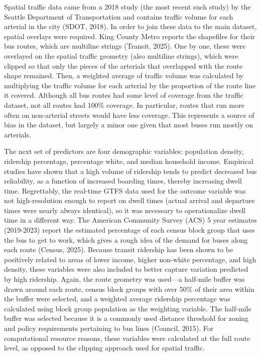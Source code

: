 \documentclass[
  12pt,
]{article}
\begin{document}
Spatial traffic data came from a 2018 study (the most recent such study)
by the Seattle Department of Transportation and contains traffic volume
for each arterial in the city (SDOT, 2018). In order to join these data
to the main dataset, spatial overlays were required. King County Metro
reports the shapefiles for their bus routes, which are multiline strings
(Transit, 2025). One by one, these were overlayed on the spatial traffic
geometry (also multiline strings), which were clipped so that only the
pieces of the arterials that overlapped with the route shape remained.
Then, a weighted average of traffic volume was calculated by multiplying
the traffic volume for each arterial by the proportion of the route line
it covered. Although all bus routes had some level of coverage from the
traffic dataset, not all routes had 100\% coverage. In particular,
routes that run more often on non-arterial streets would have less
coverage. This represents a source of bias in the dataset, but largely a
minor one given that most buses run mostly on arterials.

The next set of predictors are four demographic variables: population
density, ridership percentage, percentage white, and median household
income. Empirical studies have shown that a high volume of ridership
tends to predict decreased bus reliability, as a function of increased
boarding times, thereby increasing dwell time. Regrettably, the
real-time GTFS data used for the outcome variable was not
high-resolution enough to report on dwell times (actual arrival and
departure times were nearly always identical), so it was necessary to
operationalize dwell time in a different way. The American Community
Survey (ACS) 5 year estimates (2019-2023) report the estimated
percentage of each census block group that uses the bus to get to work,
which gives a rough idea of the demand for buses along each route
(Census, 2025). Because transit ridership has been shown to be
positively related to areas of lower income, higher non-white
percentage, and high density, these variables were also included to
better capture variation predicted by high ridership. Again, the route
geometry was used---a half-mile buffer was drawn around each route,
census block groups with over 50\% of their area within the buffer were
selected, and a weighted average ridership percentage was calculated
using block group population as the weighting variable. The half-mile
buffer was selected because it is a commonly used distance threshold for
zoning and policy requirements pertaining to bus lines (Council, 2015).
For computational resource reasons, these variables were calculated at
the full route level, as opposed to the clipping approach used for
spatial traffic.
\end{document}
